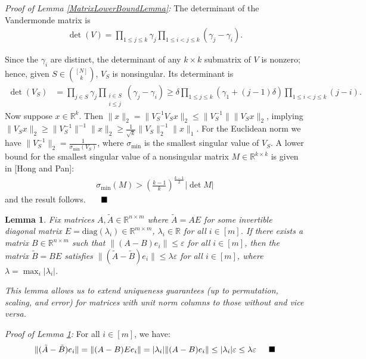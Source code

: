 \documentclass[journal,onecolumn]{IEEEtran}
\newtheorem{lemma}{Lemma}
\begin{document}
\emph{Proof of Lemma \ref{MatrixLowerBoundLemma}:} The determinant of the Vandermonde matrix is
\begin{align}
	\det(V) = \prod_{1 \leq j \leq k} \gamma_j \prod_{1 \leq i < j \leq k} (\gamma_j - \gamma_i).
\end{align}	

Since the $\gamma_i$ are distinct, the determinant of any $k \times k$ submatrix of $V$ is nonzero; hence, given $S \in {[N] \choose k}$, $V_S$ is nonsingular. Its determinant is
\begin{align}
\det(V_S) &= \prod_{j \in S} \gamma_j \prod_{\substack{i \in S \\ i\leq j }} (\gamma_j - \gamma_i)
\geq \delta \prod_{1 \leq j \leq k } (\gamma_1 + (j-1)\delta) \prod_{1 \leq i < j \leq k} (j-i).
\end{align}
Now suppose $x \in \mathbb{R}^k$. Then $\|x\|_2 = \|V_S^{-1} V_S x\|_2 \leq \|V_S^{-1}\| \|V_S x\|_2$, implying $\|V_Sx\|_2 \geq \|V_S^{-1}\|^{-1}\|x\|_2 \geq \frac{1}{\sqrt{k}} \|V_S\|_2^{-1}\|x\|_1$. For the Euclidean norm we have $\|V_S^{-1}\|_2 = \frac{1}{\sigma_{\min}(V_S)}$, where $\sigma_{\min}$ is the smallest singular value of $V_S$. A lower bound for the smallest singular value of a nonsingular matrix $M \in \mathbb{R}^{k \times k}$ is given in [Hong and Pan]:
\begin{align}
	\sigma_{\min}(M) > \left( \frac{k-1}{k} \right)^\frac{k-1}{2} |\det M|
\end{align}
%
and the result follows. $\indent \blacksquare$

\begin{lemma}\label{NormalizedDictionaryLemma}
Fix matrices $A, \tilde{A} \in \mathbb{R}^{n \times m}$ where $\tilde{A} = AE$ for some invertible diagonal matrix $E = \text{diag}(\lambda_i) \in \mathbb{R}^{m \times m}$, $\lambda_i \in \mathbb{R}$ for all $i \in [m]$. If there exists a matrix $B \in \mathbb{R}^{n \times m}$ such that $\|(A - B)e_i\| \leq \varepsilon$ for all $i \in [m]$, then the matrix $\tilde{B} = BE$ satisfies $\|(\tilde{A} - \tilde{B})e_i\| \leq \lambda \varepsilon$ for all $i \in [m]$, where $\lambda = \max_i |\lambda_i|$.

This lemma allows us to extend uniqueness guarantees (up to permutation, scaling, and error) for matrices with unit norm columns to those without and vice versa. 
\end{lemma}

\emph{Proof of Lemma \ref{NormalizedDictionaryLemma}:} For all $i \in [m]$, we have:
\begin{align*}
\|(\tilde{A} - \tilde{B})e_i\| = \|(A-B)Ee_i\| = |\lambda_i| \|(A-B)e_i\| \leq |\lambda_i| \varepsilon \leq \lambda \varepsilon 
\indent \blacksquare
\end{align*}
\end{document}
